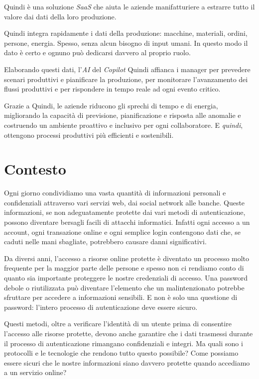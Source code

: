 Quindi è una soluzione \emph{\gls{SaaS}} che aiuta le aziende manifatturiere a estrarre tutto il valore dai dati della loro produzione.

Quindi integra rapidamente i dati della produzione: macchine, materiali, ordini, persone, energia. Spesso, senza alcun bisogno di input umani. In questo modo il dato è certo e ognuno può dedicarsi davvero al proprio ruolo.

Elaborando questi dati, l'\emph{AI} del \emph{Copilot} Quindi affianca i manager per prevedere scenari produttivi e pianificare la produzione, per monitorare l’avanzamento dei flussi produttivi e per rispondere in tempo reale ad ogni evento critico.

Grazie a Quindi, le aziende riducono gli sprechi di tempo e di energia, migliorando la capacità di previsione, pianificazione e risposta alle anomalie e costruendo un ambiente proattivo e inclusivo per ogni collaboratore. E \emph{quindi}, ottengono processi produttivi più efficienti e sostenibili.


\section{Contesto}

Ogni giorno condividiamo una vasta quantità di informazioni personali e confidenziali attraverso vari servizi web, dai social network alle banche.
Queste informazioni, se non adeguatamente protette dai vari metodi di autenticazione, possono diventare bersagli facili di attacchi informatici.
Infatti ogni accesso a un account, ogni transazione online e ogni semplice login contengono dati che, se caduti nelle mani sbagliate, potrebbero causare danni significativi.

Da diversi anni, l'accesso a risorse online protette è diventato un processo molto frequente per la maggior parte delle persone e spesso non ci rendiamo conto di quanto sia importante proteggere le nostre credenziali di accesso.
Una password debole o riutilizzata può diventare l'elemento che un malintenzionato potrebbe sfruttare per accedere a informazioni sensibili.
E non è solo una questione di password: l'intero processo di autenticazione deve essere sicuro.

Questi metodi, oltre a verificare l'identità di un utente prima di consentire l'accesso alle risorse protette, devono anche garantire che i dati trasmessi durante il processo di autenticazione rimangano confidenziali e integri.
Ma quali sono i protocolli e le tecnologie che rendono tutto questo possibile? Come possiamo essere sicuri che le nostre informazioni siano davvero protette quando accediamo a un servizio online?

